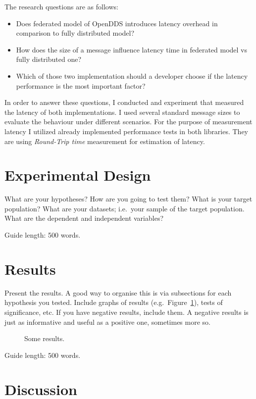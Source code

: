 \documentclass{csfourzero}
\begin{document}
The research questions are as follows:
\begin{itemize}
	\item Does federated model of OpenDDS introduces latency overhead in comparison to fully distributed model?
	\item How does the size of a message influence latency time in federated model vs fully distributed one?
	\item Which of those two implementation should a developer choose if the latency performance is the most important factor?
\end{itemize}

In order to answer these questions, I conducted and experiment that measured the latency of both implementations. I used several standard message sizes to evaluate the behaviour under different scenarios. For the purpose of measurement latency I utilized already implemented performance tests in both libraries. They are using \textit{Round-Trip time} measurement for estimation of latency. 

\section{Experimental Design}
\label{sec:exp}

What are your hypotheses? How are you going to test them? What is your
target population? What are your datasets; i.e.\ your sample of the
target population. What are the dependent and independent variables?

Guide length: 500 words.

\section{Results}
\label{sec:results}

Present the results. A good way to organise this is via subsections
for each hypothesis you tested. Include graphs of results
(e.g.\ Figure~\ref{fig:data}), tests of significance, etc. If you have
negative results, include them. A negative results is just as
informative and useful as a positive one, sometimes more so.

\begin{figure}

\caption{Some results.}\label{fig:data}
\end{figure}

Guide length: 500 words.

\section{Discussion}
\label{sec:discuss}
\end{document}
